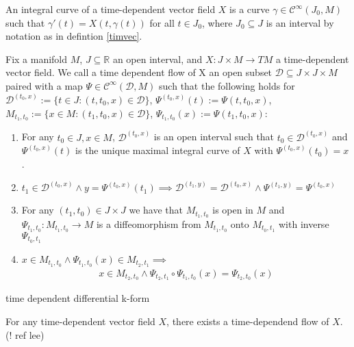 \begin{definition}
An integral curve of a time-dependent vector field $X$ is a curve $\gamma \in \mathcal{C}^\infty(J_0,M)$ such that $\gamma '(t) = X(t,\gamma(t))$ for all $t \in J_0$, where $J_0 \subseteq J$ is an interval by notation as in defintion \ref{timvec}.
\end{definition}

\begin{definition}
Fix a manifold $M$, $J \subseteq \mathbb{R}$ an open interval, and $X : J\times M \to TM$ a time-dependent vector field. We call a time dependent flow of X an open subset $\mathcal{D} \subseteq J \times J \times M$ paired with a map $\Psi \in \mathcal{C}^\infty(\mathcal{D},M)$ such that the following holds for $\mathcal{D}^{(t_0,x)} := \{t\in J: (t,t_0,x) \in \mathcal{D} \}$, $\Psi^{(t_0,x)}(t) := \Psi(t,t_0,x)$, $M_{t_1,t_0} := \{ x \in M:(t_1,t_0,x) \in \mathcal{D} \}$, $\Psi_{t_1,t_0}(x):= \Psi(t_1,t_0,x)$:
\begin{enumerate}
\item For any $t_0 \in J, x \in M$, $\mathcal{D}^{(t_0,x)}$ is an open interval such that $t_0 \in \mathcal{D}^{(t_0,x)}$ and $\Psi^{(t_0,x)}(t)$ is the unique maximal integral curve of $X$ with $\Psi^{(t_0,x)}(t_0) = x$.
\item $t_1 \in \mathcal{D}^{(t_0,x)} \land y = \Psi^{(t_0,x)}(t_1) \implies \mathcal{D}^{(t_1,y)} = \mathcal{D}^{(t_0,x)} \land \Psi^{(t_1,y)} = \Psi^{(t_0,x)}$
\item For any $(t_1,t_0) \in J \times J$ we have that $M_{t_1,t_0}$ is open in $M$ and $\Psi_{t_1,t_0}: M_{t_1,t_0} \to M$ is a diffeomorphism from $M_{t_1,t_0}$ onto $M_{t_0,t_1}$ with inverse $\Psi_{t_0,t_1}$
\item $x \in M_{t_1,t_0} \land \Psi_{t_1,t_0}(x) \in M_{t_2,t_1} \implies$
\begin{align*}
x \in M_{t_2,t_0} \land \Psi_{t_2,t_1} \circ \Psi_{t_1,t_0}(x) = \Psi_{t_2, t_0}(x)
\end{align*}
\end{enumerate}
\end{definition}

\begin{definition}
time dependent differential k-form
\end{definition}

\begin{theorem} \label{flowthm}
For any time-dependent vector field $X$, there exists a time-dependend flow of $X$. (! ref lee)
\end{theorem}

